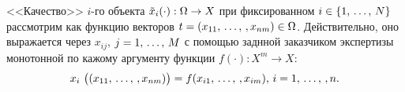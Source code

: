 <<Качество>> $i$-го объекта  $\tilde x_i(\cdot): \Omega \rightarrow X$ при фиксированном $i \in \{1,\, \ldots,\, N\}$ рассмотрим как функцию векторов $t = (x_{11}, \, \ldots,\,, x_{nm}) \in \Omega$. Действительно, оно выражается через $x_{ij}$, $j = 1,\, \ldots,\, M$ с помощью заднной заказчиком экспертизы монотонной по кажому аргументу функции $f(\cdot): X^m \rightarrow X$:
\begin{equation}
  \label{e:function_f}
  x_i~\big((x_{11}, \, \ldots,\,, x_{nm})\big) = f(x_{i1}, \, \ldots,\,, x_{im}),\,i = 1, \, \ldots,\,, n.
\end{equation}

